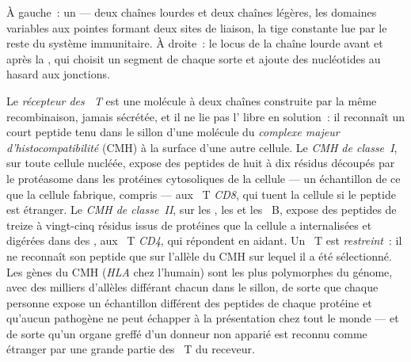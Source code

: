 \begin{omfigure}
{\small À gauche~: un  --- deux chaînes lourdes et deux chaînes
légères, les domaines variables aux pointes formant deux sites de
liaison, la tige constante lue par le reste du système immunitaire. À
droite~: le locus de la chaîne lourde avant et après la , qui choisit un segment de chaque sorte et ajoute des nucléotides
au hasard aux jonctions.}
\end{omfigure}

\begin{definition}\label{def:b3:adaptive-immunity:mhc}
Le \emph{récepteur des ~T} est une molécule à deux chaînes
construite par la même recombinaison, jamais sécrétée, et il ne lie pas
l' libre en solution~: il reconnaît un court peptide tenu dans
le sillon d'une molécule du \emph{complexe majeur d'histocompatibilité}
(CMH) à la surface d'une autre cellule. Le \emph{CMH de classe~I}, sur
toute cellule nucléée, expose des peptides de huit à dix résidus
découpés par le protéasome dans les protéines cytosoliques de la cellule
--- un échantillon de ce que la cellule fabrique,  compris --- aux
~T \emph{CD8}, qui tuent la cellule si le peptide est
étranger. Le \emph{CMH de classe~II}, sur les , les
 et les ~B, expose des peptides de treize à
vingt-cinq résidus issus de protéines que la cellule a internalisées et
digérées dans des , aux ~T \emph{CD4}, qui répondent
en aidant. Un ~T est \emph{restreint}~: il ne reconnaît son
peptide que sur l'allèle du CMH sur lequel il a été sélectionné. Les
gènes du CMH (\emph{HLA} chez l'humain) sont les plus polymorphes du
génome, avec des milliers d'allèles différant chacun dans le sillon, de
sorte que chaque personne expose un échantillon différent des peptides
de chaque protéine et qu'aucun pathogène ne peut échapper à la
présentation chez tout le monde --- et de sorte qu'un organe greffé d'un
donneur non apparié est reconnu comme étranger par une grande partie des
~T du receveur.
\end{definition}

